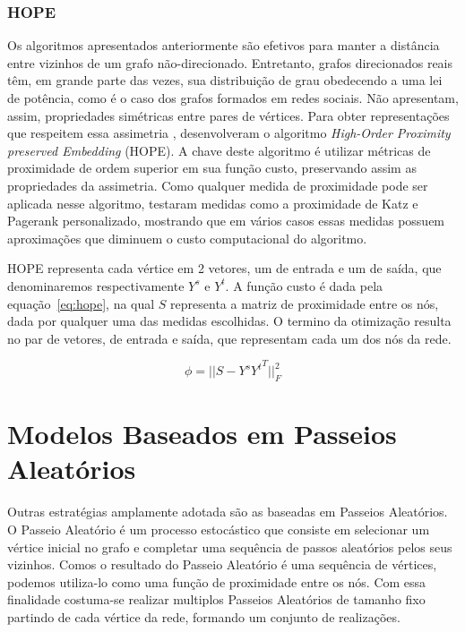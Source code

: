 \subsubsection{HOPE}

Os algoritmos apresentados anteriormente são efetivos para manter a distância
entre vizinhos de um grafo não-direcionado.
Entretanto, grafos direcionados reais têm, em grande parte das vezes, sua
distribuição de grau obedecendo a uma lei de potência, como é o caso dos grafos
formados em redes sociais.
Não apresentam, assim, propriedades simétricas entre pares de vértices.
Para obter representações que respeitem essa assimetria \citet{ou16},
desenvolveram o algoritmo \textit{High-Order Proximity preserved Embedding}
(HOPE).
A chave deste algoritmo é utilizar métricas de proximidade de ordem superior em
sua função custo, preservando assim as propriedades da assimetria.
Como qualquer medida de proximidade pode ser aplicada nesse algoritmo, \citet{ou16}
testaram medidas como a proximidade de Katz e Pagerank personalizado, mostrando
que em vários casos essas medidas possuem aproximações que diminuem o custo
computacional do algoritmo.

HOPE representa cada vértice em 2 vetores, um de entrada e um de saída, que
denominaremos respectivamente $Y^s$ e $Y^t$.
A função custo é dada pela equação~\ref{eq:hope}, na qual $S$ representa a matriz
de proximidade entre os nós, dada por qualquer uma das medidas escolhidas.
O termino da otimização resulta no par de vetores, de entrada e saída, que
representam cada um dos nós da rede.

\begin{equation} \label{eq:hope}
    \phi = \vert\vert S - Y^s {Y^t}^{T} \vert\vert^2_F
\end{equation}

\section{Modelos Baseados em Passeios Aleatórios}

Outras estratégias amplamente adotada são as baseadas em Passeios Aleatórios.
O Passeio Aleatório é um processo estocástico que consiste em selecionar um
vértice inicial no grafo e completar uma sequência de passos aleatórios pelos
seus vizinhos.
Comos o resultado do Passeio Aleatório é uma sequência de vértices, podemos
utiliza-lo como uma função de proximidade entre os nós.
Com essa finalidade costuma-se realizar multiplos Passeios Aleatórios de tamanho
fixo partindo de cada vértice da rede, formando um conjunto de realizações.

